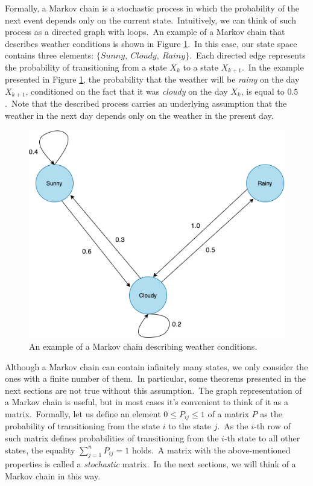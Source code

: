 \documentclass[shortabstract, english, lic]{iithesis}
\theoremstyle{default_theorem_style}\newtheorem{theorem}{Theorem}
\theoremstyle{default_theorem_style}\newtheorem{definition}{Definition}
\begin{document}
Formally, a Markov chain is a stochastic process in which the probability of the next event depends only on the current
state.\ Intuitively, we can think of such process as a directed graph with loops.\ An example of a Markov chain that
describes weather conditions is shown in Figure \ref{fig:markov_chain}.\ In this case, our state space contains three
elements: $\{Sunny,\ Cloudy,\ Rainy\}$.\ Each directed edge represents the probability of transitioning from a state
$X_k$ to a state $X_{k + 1}$.\ In the example presented in Figure \ref{fig:markov_chain}, the probability that the
weather will be \textit{rainy} on the day $X_{k + 1}$, conditioned on the fact that it was \textit{cloudy} on the
day $X_k$, is equal to $0.5$.\ Note that the described process carries an underlying assumption that the weather in
the next day depends only on the weather in the present day.\newline

\begin{figure}[H]
\centering
\includegraphics[scale=0.43]{markov_chain}
\caption{An example of a Markov chain describing weather conditions.}
\label{fig:markov_chain}
\end{figure}

\noindent Although a Markov chain can contain infinitely many states, we only consider
the ones with a finite number of them.\ In particular, some theorems presented in the next sections
are not true without this assumption.\ The graph representation of a Markov chain is useful, but in most cases
it's convenient to think of it as a matrix.\ Formally, let us define an element $0 \leq P_{ij} \leq 1$ of a matrix
$P$ as the probability of transitioning from the state $i$ to the state $j$.\ As the $i$-th row of such matrix
defines probabilities of transitioning from the $i$-th  state to all other states, the equality
$\sum_{j = 1}^{n} P_{ij} = 1$ holds.\ A matrix with the above-mentioned properties is called a
\textit{stochastic} matrix.\ In the next sections, we will think of a Markov chain in this way.
\end{document}
